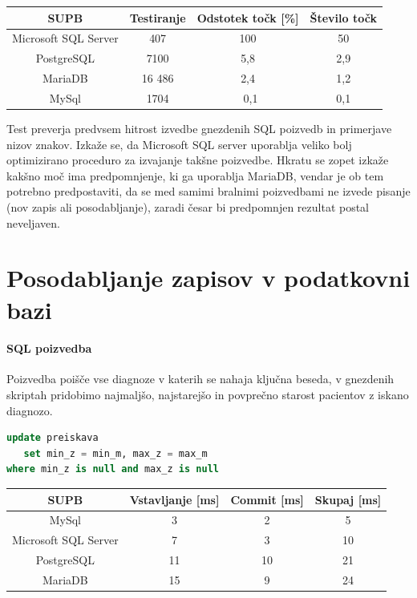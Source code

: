 \documentclass[a4paper,11pt]{report}
\begin{document}
\begin{center}
   \begin{tabular}{||c|c|c|c||}
      \hline
      \textbf{SUPB} & \textbf{Testiranje} & \textbf{Odstotek točk [\%]} & \textbf{Število točk}\\
      \hline
      \hline
      Microsoft SQL Server & 407 & 100 & 50 \\
      PostgreSQL & 7100 & 5,8 & 2,9\\
      MariaDB & 16 486 & 2,4 & 1,2 \\
      MySql & 1704 & ~0,1 & 0,1 \\
      \hline
   \end{tabular}
\end{center}

Test preverja predvsem hitrost izvedbe gnezdenih SQL poizvedb in primerjave nizov znakov. 
Izkaže se, da Microsoft SQL server uporablja veliko bolj optimizirano proceduro za izvajanje takšne poizvedbe. Hkratu
se zopet izkaže kakšno moč ima predpomnjenje, ki ga uporablja MariaDB, vendar je ob tem potrebno predpostaviti, da se
med samimi bralnimi poizvedbami ne izvede pisanje (nov zapis ali posodabljanje), zaradi česar bi predpomnjen rezultat postal neveljaven.

\section{Posodabljanje zapisov v podatkovni bazi}

\paragraph{SQL poizvedba}
Poizvedba poišče vse diagnoze v katerih se nahaja ključna beseda, v gnezdenih skriptah pridobimo
najmaljšo, najstarejšo in povprečno starost pacientov z iskano diagnozo.

\begin{lstlisting}[language = SQL]
update preiskava
   set min_z = min_m, max_z = max_m
where min_z is null and max_z is null
\end{lstlisting}

\begin{center}
   \begin{tabular}{||c|c|c|c||}
      \hline
      \textbf{SUPB} & \textbf{Vstavljanje [ms]} & \textbf{Commit [ms]} & \textbf{Skupaj [ms]}\\
      \hline
      \hline
      MySql & 3 & 2 & 5\\
      Microsoft SQL Server & 7 & 3 & 10 \\
      PostgreSQL & 11 & 10 & 21 \\
      MariaDB & 15 & 9 & 24 \\
      \hline
   \end{tabular}
\end{center}
\end{document}

